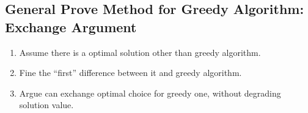 \subsection{General Prove Method for Greedy Algorithm: Exchange Argument}
\begin{enumerate}
    \item Assume there is a optimal solution other than greedy algorithm.
    \item Fine the ``first'' difference between it and greedy algorithm.
    \item Argue can exchange optimal choice for greedy one, without degrading solution value.
\end{enumerate}

